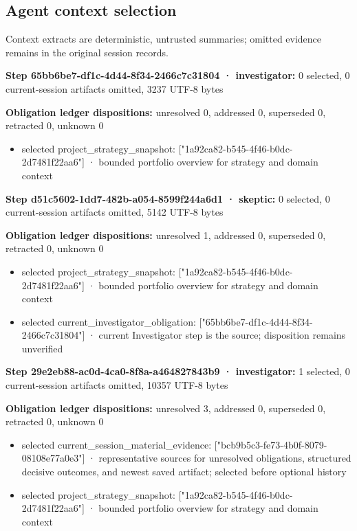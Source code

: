 \documentclass[11pt]{article}
\begin{document}
\subsection{Agent context selection}
Context extracts are deterministic, untrusted summaries; omitted evidence remains in the original session records.\par
\textbf{Step 65bb6be7-df1c-4d44-8f34-2466c7c31804 · investigator:} 0 selected, 0 current-session artifacts omitted, 3237 UTF-8 bytes\par
\textbf{Obligation ledger dispositions:} unresolved 0, addressed 0, superseded 0, retracted 0, unknown 0\par
\begin{itemize}
\item selected project\_strategy\_snapshot: ["1a92ca82-b545-4f46-b0dc-2d7481f22aa6"] · bounded portfolio overview for strategy and domain context
\end{itemize}
\textbf{Step d51c5602-1dd7-482b-a054-8599f244a6d1 · skeptic:} 0 selected, 0 current-session artifacts omitted, 5142 UTF-8 bytes\par
\textbf{Obligation ledger dispositions:} unresolved 1, addressed 0, superseded 0, retracted 0, unknown 0\par
\begin{itemize}
\item selected project\_strategy\_snapshot: ["1a92ca82-b545-4f46-b0dc-2d7481f22aa6"] · bounded portfolio overview for strategy and domain context
\item selected current\_investigator\_obligation: ["65bb6be7-df1c-4d44-8f34-2466c7c31804"] · current Investigator step is the source; disposition remains unverified
\end{itemize}
\textbf{Step 29e2eb88-ac0d-4ca0-8f8a-a464827843b9 · investigator:} 1 selected, 0 current-session artifacts omitted, 10357 UTF-8 bytes\par
\textbf{Obligation ledger dispositions:} unresolved 3, addressed 0, superseded 0, retracted 0, unknown 0\par
\begin{itemize}
\item selected current\_session\_material\_evidence: ["bcb9b5c3-fe73-4b0f-8079-08108e77a0e3"] · representative sources for unresolved obligations, structured decisive outcomes, and newest saved artifact; selected before optional history
\item selected project\_strategy\_snapshot: ["1a92ca82-b545-4f46-b0dc-2d7481f22aa6"] · bounded portfolio overview for strategy and domain context
\end{itemize}
\end{document}
